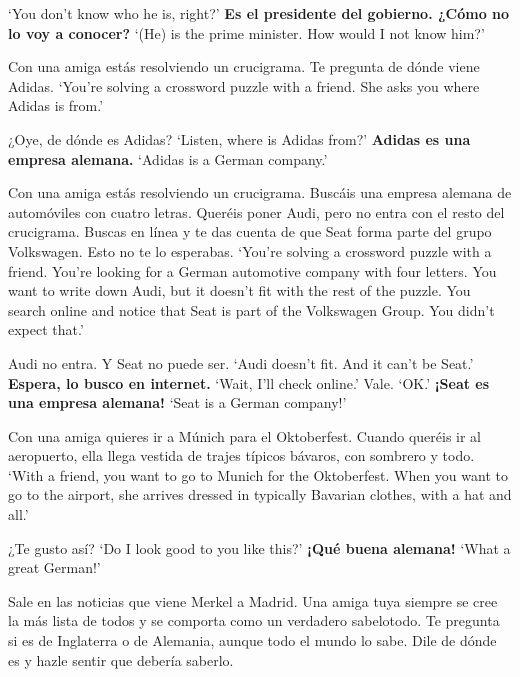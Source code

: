 \begin{exe}
\begin{xlist}[A:]
	\glt `You don't know who he is, right?' 
	 \textbf{Es el presidente del gobierno. ¿Cómo no lo voy a conocer?} 
	\glt `(He) is the prime minister. How would I not know him?' 
	\end{xlist}
\ex \label{ex:experimentoNEUTRALDECLalemana_APP}
	Con una amiga estás resolviendo un crucigrama. Te pregunta de dónde viene Adidas. 
	\glt `You're solving a crossword puzzle with a friend. She asks you where Adidas is from.' 
	\begin{xlist}[A:]
	 ¿Oye, de dónde es Adidas? \href{https://osf.io/f6m5g/}{\faVolumeUp}
	\glt `Listen, where is Adidas from?' 
	 \textbf{Adidas es una empresa alemana.}
	\glt `Adidas is a German company.' 
	\end{xlist}
\ex \label{ex:experimentoMIRDECLalemana_APP}
	Con una amiga estás resolviendo un crucigrama. Buscáis una empresa alemana de automóviles con cuatro letras. Queréis poner Audi, pero no entra con el resto del crucigrama. Buscas en línea y te das cuenta de que Seat forma parte del grupo Volkswagen. Esto no te lo esperabas. 
	\glt `You're solving a crossword puzzle with a friend. You're looking for a German automotive company with four letters. You want to write down Audi, but it doesn't fit with the rest of the puzzle. You search online and notice that Seat is part of the Volkswagen Group. You didn't expect that.' 
	\begin{xlist}[A:]
	 Audi no entra. Y Seat no puede ser. \href{https://osf.io/nxywh/}{\faVolumeUp}
	\glt `Audi doesn't fit. And it can't be Seat.' 
	 \textbf{Espera, lo busco en internet.} 
	\glt `Wait, I'll check online.' 
	 Vale. \href{https://osf.io/bgezq/}{\faVolumeUp}
	\glt `OK.' 
	 \textbf{¡Seat es una empresa alemana!} 
	\glt `Seat is a German company!' 
	\end{xlist}
\ex \label{ex:experimentoEXCLalemana_APP}
	Con una amiga quieres ir a Múnich para el Oktoberfest. Cuando queréis ir al aeropuerto, ella llega vestida de trajes típicos bávaros, con sombrero y todo. 
	\glt `With a friend, you want to go to Munich for the Oktoberfest. When you want to go to the airport, she arrives dressed in typically Bavarian clothes, with a hat and all.' 
	\begin{xlist}[A:]
	 ¿Te gusto así? \href{https://osf.io/ghxn2/}{\faVolumeUp}
	\glt `Do I look good to you like this?' 
	 \textbf{¡Qué buena alemana!}  
	\glt `What a great German!' 
	\end{xlist}
\ex \label{ex:experimentoOBVASSalemana_APP}
	Sale en las noticias que viene Merkel a Madrid. Una amiga tuya siempre se cree la más lista de todos y se comporta como un verdadero sabelotodo. Te pregunta si es de Inglaterra o de Alemania, aunque todo el mundo lo sabe. Dile de dónde es y hazle sentir que debería saberlo. 

\end{exe}
